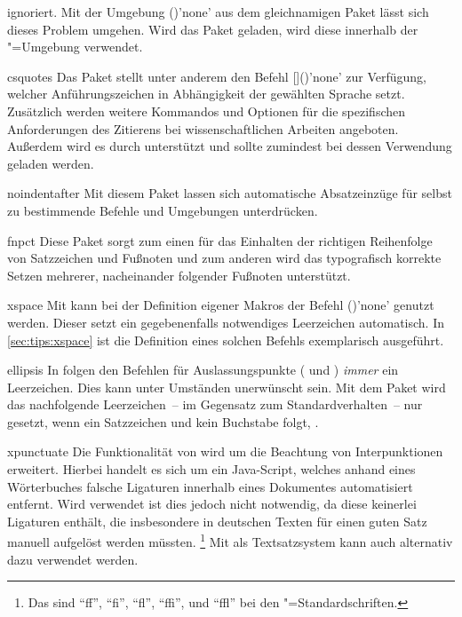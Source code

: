 \begin{packages}
  ignoriert. Mit der Umgebung ()'none'
  aus dem gleichnamigen Paket lässt sich dieses Problem umgehen. Wird das Paket 
  geladen, wird diese innerhalb der "=Umgebung verwendet.
\item[csquotes]
  Das Paket stellt unter anderem den Befehl 
  []()'none'
  zur Verfügung, welcher Anführungszeichen in Abhängigkeit der gewählten 
  Sprache setzt. Zusätzlich werden weitere Kommandos und Optionen für die 
  spezifischen Anforderungen des Zitierens bei wissenschaftlichen Arbeiten 
  angeboten. Außerdem wird es durch  unterstützt und sollte 
  zumindest bei dessen Verwendung geladen werden.
\item[noindentafter]
  Mit diesem Paket lassen sich automatische Absatzeinzüge für selbst zu 
  bestimmende Befehle und Umgebungen unterdrücken.
\item[fnpct]
  Diese Paket sorgt zum einen für das Einhalten der richtigen Reihenfolge von 
  Satzzeichen und Fußnoten und zum anderen wird das typografisch korrekte 
  Setzen mehrerer, nacheinander folgender Fußnoten unterstützt.
\item[xspace]
  Mit  kann bei der Definition eigener Makros der Befehl 
  ()'none' genutzt werden. Dieser setzt ein 
  gegebenenfalls notwendiges Leerzeichen automatisch. In 
  \autoref{sec:tips:xspace} ist die Definition eines solchen Befehls 
  exemplarisch ausgeführt.
\item[ellipsis]
  In  folgen den Befehlen für Auslassungspunkte ( und 
  ) \emph{immer} ein Leerzeichen. Dies kann unter Umständen 
  unerwünscht sein. Mit dem Paket  wird das nachfolgende 
  Leerzeichen~-- im Gegensatz zum Standardverhalten~-- nur gesetzt, wenn ein 
  Satzzeichen und kein Buchstabe folgt, .
\item[xpunctuate]
  Die Funktionalität von  wird um die Beachtung von 
  Interpunktionen erweitert.
  Hierbei handelt es sich um ein Java-Script, welches anhand eines Wörterbuches 
  falsche Ligaturen innerhalb eines Dokumentes automatisiert entfernt. Wird 
  \Univers verwendet ist dies jedoch nicht notwendig, da diese keinerlei 
  Ligaturen enthält, die insbesondere in deutschen Texten für einen guten Satz 
  manuell aufgelöst werden müssten.%
  \footnote{%
    Das sind \enquote{ff}, \enquote{fi}, \enquote{fl}, \enquote{ffi}, und 
    \enquote{ffl} bei den "=Standardschriften.%
  }
  Mit  als Textsatzsystem kann auch  
  alternativ dazu verwendet werden.
%
\end{packages}


